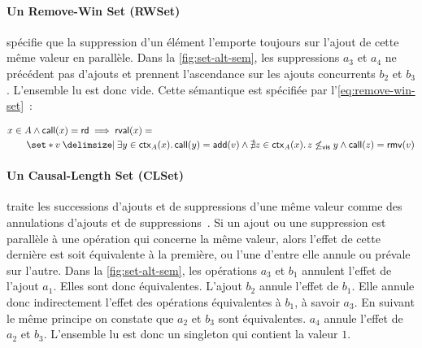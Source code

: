 \paragraph{Un Remove-Win Set (RWSet)} spécifie que la suppression d'un élément l'emporte toujours sur l'ajout de cette même valeur en parallèle.
Dans la \autoref{fig:set-alt-sem}, les suppressions $a_3$ et $a_4$ ne précédent pas d'ajouts et prennent l'ascendance sur les ajouts concurrents $b_2$ et $b_3$.
L'ensemble lu est donc vide.
Cette sémantique est spécifiée par l'\autoref{eq:remove-win-set}~:

\begin{equation}\begin{split}\label{eq:remove-win-set}
\MoveEqLeft x \in A \land \trm{call}(x) = \trm{rd} \implies \trm{rval}(x) =\\
    &\set*{v \given \exists y \in \trm{ctx}_A(x) \qsep \trm{call}(y) = \trm{add}(v) \land \nexists z \in \trm{ctx}_A(x) \qsep z \not\viseq y \land \trm{call}(z) = \trm{rmv}(v)}
\end{split}\end{equation}

\paragraph{Un Causal-Length Set (CLSet)~\autocite{yu2020_clset}} traite les successions d'ajouts et de suppressions d'une même valeur comme des annulations d'ajouts et de suppressions~\autocite{2019_yu_genericundo}.
Si un ajout ou une suppression est parallèle à une opération qui concerne la même valeur, alors l'effet de cette dernière est soit équivalente à la première, ou l'une d'entre elle annule ou prévale sur l'autre.
Dans la \autoref{fig:set-alt-sem}, les opérations $a_3$ et $b_1$ annulent l'effet de l'ajout $a_1$.
Elles sont donc équivalentes.
L'ajout $b_2$ annule l'effet de $b_1$.
Elle annule donc indirectement l'effet des opérations équivalentes à $b_1$, à savoir $a_3$.
En suivant le même principe on constate que $a_2$ et $b_3$ sont équivalentes.
$a_4$ annule l'effet de $a_2$ et $b_3$.
L'ensemble lu est donc un singleton qui contient la valeur $1$.

